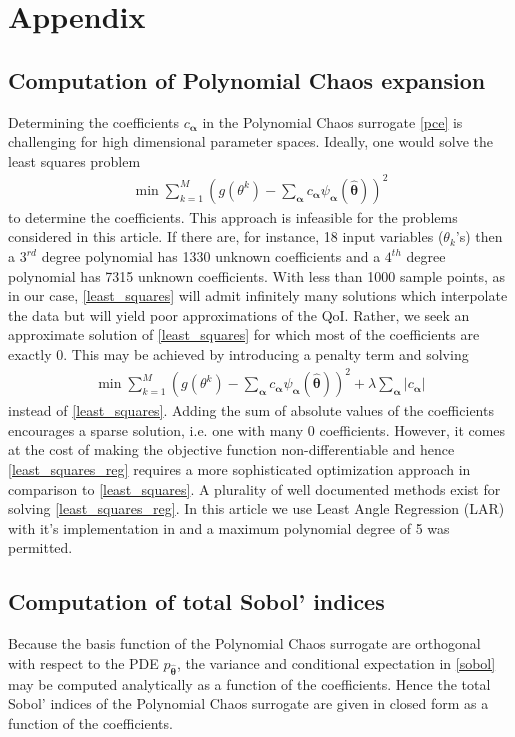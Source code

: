 \section*{Appendix}

\subsection*{Computation of Polynomial Chaos expansion}
Determining the coefficients $c_{\boldsymbol{\alpha}}$ in the Polynomial Chaos surrogate \eqref{pce} is challenging for high dimensional parameter spaces. Ideally, one would solve the least squares problem
\begin{eqnarray}
\label{least_squares}
\min \sum\limits_{k=1}^M \left(g(\theta^k)-\sum_{\boldsymbol{\alpha}} c_{\boldsymbol{\alpha}} \psi_{\boldsymbol{\alpha}}(\hat{\boldsymbol{\theta}}) \right)^2
\end{eqnarray}
to determine the coefficients. This approach is infeasible for the problems considered in this article. If there are, for instance, 18 input variables ($\theta_k$'s) then a $3^{rd}$ degree polynomial has 1330 unknown coefficients and a $4^{th}$ degree polynomial has 7315 unknown coefficients. With less than 1000 sample points, as in our case, \eqref{least_squares} will admit infinitely many solutions which interpolate the data but will yield poor approximations of the QoI. Rather, we seek an approximate solution of \eqref{least_squares} for which most of the coefficients are exactly 0. This may be achieved by introducing a penalty term and solving
\begin{eqnarray}
\label{least_squares_reg}
\min \sum\limits_{k=1}^M \left(g(\theta^k)-\sum_{\boldsymbol{\alpha}} c_{\boldsymbol{\alpha}} \psi_{\boldsymbol{\alpha}}(\hat{\boldsymbol{\theta}}) \right)^2 + \lambda \sum_{\boldsymbol{\alpha}} \vert c_{\boldsymbol{\alpha}} \vert
\end{eqnarray}
instead of \eqref{least_squares}. Adding the sum of absolute values of the coefficients encourages a sparse solution, i.e. one with many 0 coefficients. However, it comes at the cost of making the objective function non-differentiable and hence \eqref{least_squares_reg} requires a more sophisticated optimization approach in comparison to \eqref{least_squares}. A plurality of well documented methods exist for solving \eqref{least_squares_reg}. In this article we use Least Angle Regression (LAR) \cite{lar} with it's implementation in \cite{uqlab} and a maximum polynomial degree of 5 was permitted.

\subsection*{Computation of total Sobol' indices}
Because the basis function of the Polynomial Chaos surrogate are orthogonal with respect to the PDE $p_{\hat{\boldsymbol{\theta}}}$, the variance and conditional expectation in \eqref{sobol} may be computed analytically as a function of the coefficients. Hence the total Sobol' indices of the Polynomial Chaos surrogate are given in closed form as a function of the coefficients.